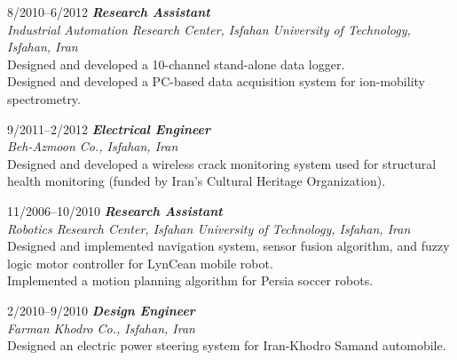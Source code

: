 \documentclass[10pt]{article}
\newlength{\Vspace}
\newlength{\Vspace}
\begin{document}
\begin{CV}
\item[8/2010--6/2012] \textbf{\textit{Research Assistant}} \\
    \textit{Industrial Automation Research Center, Isfahan University of Technology, Isfahan, Iran}\vspace{\Vspace} \\
    Designed and developed a 10-channel stand-alone data logger. \\
    Designed and developed a PC-based data acquisition system for ion-mobility spectrometry.

\item[9/2011--2/2012] \textbf{\textit{Electrical Engineer}} \\
    \textit{Beh-Azmoon Co., Isfahan, Iran}\vspace{\Vspace} \\
    Designed and developed a wireless crack monitoring system used for structural health monitoring (funded by Iran's Cultural Heritage Organization).

\item[11/2006--10/2010] \textbf{\textit{Research Assistant}} \\
    \textit{Robotics Research Center, Isfahan University of Technology, Isfahan, Iran}\vspace{\Vspace} \\
    Designed and implemented navigation system, sensor fusion algorithm, and fuzzy logic motor controller for LynCean mobile robot. \\
    Implemented a motion planning algorithm for Persia soccer robots.

\item[2/2010--9/2010] \textbf{\textit{Design Engineer}} \\
    \textit{Farman Khodro Co., Isfahan, Iran}\vspace{\Vspace} \\
    Designed an electric power steering system for Iran-Khodro Samand automobile.



\end{CV}
\end{document}
